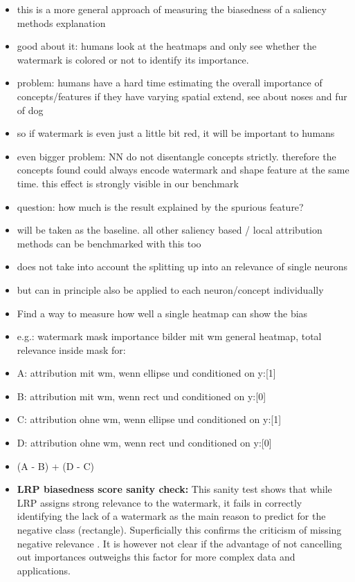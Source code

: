 \begin{itemize}
    \item this is a more general approach of measuring the biasedness of a saliency methods explanation
    \item good about it: humans look at the heatmaps and only see whether the watermark is colored or not to identify its importance.
    \item problem: humans have a hard time estimating the overall importance of concepts/features if they have varying spatial extend, see \cite{Achtibat2022} about noses and fur of dog
    \item so if watermark is even just a little bit red, it will be important to humans
    \item even bigger problem: NN do not disentangle concepts strictly. therefore the concepts found could always encode watermark and shape feature at the same time. this effect is strongly visible in our benchmark
    \item question: how much is the result explained by the spurious feature?
    \item will be taken as the baseline. all other saliency based / local attribution methods can be benchmarked with this too
    \item does not take into account the splitting up into an relevance of single neurons
    \item but can in principle also be applied to each neuron/concept individually
    \item Find a way to measure how well a single heatmap can show the bias
    \item e.g.: watermark mask importance bilder mit wm general heatmap, total relevance inside mask for:
    \item A: attribution mit wm, wenn ellipse und conditioned on y:[1]
    \item B: attribution mit wm, wenn rect    und conditioned on y:[0]
    \item C: attribution ohne wm, wenn ellipse und conditioned on y:[1]
    \item D: attribution ohne wm, wenn rect    und conditioned on y:[0]
    \item (A - B) + (D - C)
    \item \textbf{LRP biasedness score sanity check:}
          This sanity test shows that while LRP assigns strong relevance to the watermark, it fails in correctly identifying the lack of a watermark as the main reason to predict for the negative class (rectangle). Superficially this confirms the criticism of missing negative relevance \cite{Sixt2020}. It is however not clear if the advantage of not cancelling out importances outweighs this factor for more complex data and applications.  


\end{itemize}

